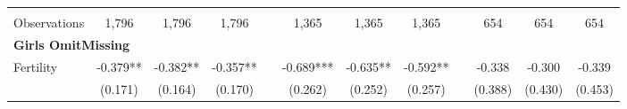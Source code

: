 \begin{landscape}
\begin{table}[htpb!]
\begin{center}
\begin{tabular}{lcccp{2mm}cccp{2mm}ccc}
\begin{footnotesize}\end{footnotesize}&\begin{footnotesize}\end{footnotesize}&\begin{footnotesize}\end{footnotesize}&\begin{footnotesize}\end{footnotesize}&\begin{footnotesize}\end{footnotesize}&\begin{footnotesize}\end{footnotesize}&\begin{footnotesize}\end{footnotesize}&\begin{footnotesize}\end{footnotesize}&\begin{footnotesize}\end{footnotesize}&\begin{footnotesize}\end{footnotesize}&\begin{footnotesize}\end{footnotesize}&\begin{footnotesize}\end{footnotesize}\\Observations&1,796&1,796&1,796&&1,365&1,365&1,365&&654&654&654\\
\multicolumn{12}{l}{\textbf{Girls OmitMissing}}\\ 
Fertility&-0.379**&-0.382**&-0.357**&&-0.689***&-0.635**&-0.592**&&-0.338&-0.300&-0.339\\
&(0.171)&(0.164)&(0.170)&&(0.262)&(0.252)&(0.257)&&(0.388)&(0.430)&(0.453)\\

\end{tabular}
\end{center}
\end{table}
\end{landscape}
